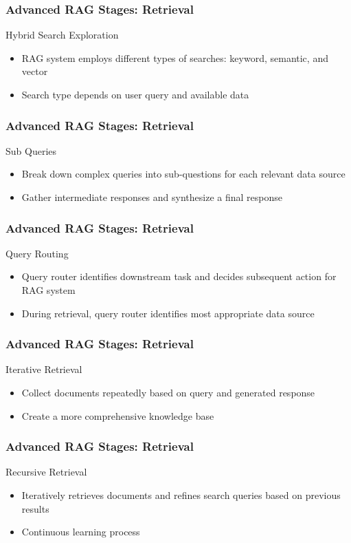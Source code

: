 \begin{frame}[fragile]\frametitle{Advanced RAG Stages: Retrieval}
Hybrid Search Exploration
  \begin{itemize}
    \item RAG system employs different types of searches: keyword, semantic, and vector
    \item Search type depends on user query and available data
  \end{itemize}
\end{frame}

\begin{frame}[fragile]\frametitle{Advanced RAG Stages: Retrieval}
Sub Queries
  \begin{itemize}
    \item Break down complex queries into sub-questions for each relevant data source
    \item Gather intermediate responses and synthesize a final response
  \end{itemize}
\end{frame}

\begin{frame}[fragile]\frametitle{Advanced RAG Stages: Retrieval}
Query Routing
  \begin{itemize}
    \item Query router identifies downstream task and decides subsequent action for RAG system
    \item During retrieval, query router identifies most appropriate data source
  \end{itemize}
\end{frame}

\begin{frame}[fragile]\frametitle{Advanced RAG Stages: Retrieval}
Iterative Retrieval
  \begin{itemize}
    \item Collect documents repeatedly based on query and generated response
    \item Create a more comprehensive knowledge base
  \end{itemize}
\end{frame}

\begin{frame}[fragile]\frametitle{Advanced RAG Stages: Retrieval}
Recursive Retrieval
  \begin{itemize}
    \item Iteratively retrieves documents and refines search queries based on previous results
    \item Continuous learning process
  \end{itemize}
\end{frame}

